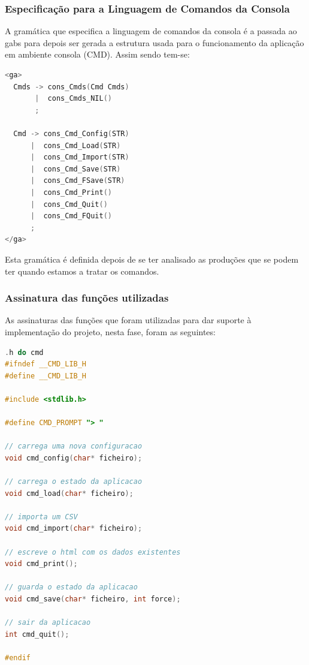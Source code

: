 \documentclass[11pt, a4paper, oneside]{article}
\begin{document}
\subsubsection{Especificação para a Linguagem de Comandos da Consola}
A gramática que especifica a linguagem de comandos da consola é a passada ao \textsf{gabs} para depois ser gerada a estrutura usada para o funcionamento da aplicação em ambiente consola (CMD). Assim sendo tem-se:
\begin{lstlisting}[language=C, caption={Gramática para a linguagem de especificação para a linguagem de comandos de consola.}]
<ga>
  Cmds -> cons_Cmds(Cmd Cmds)
       |  cons_Cmds_NIL()
       ;

  Cmd -> cons_Cmd_Config(STR)
      |  cons_Cmd_Load(STR)
      |  cons_Cmd_Import(STR)
      |  cons_Cmd_Save(STR)
      |  cons_Cmd_FSave(STR)
      |  cons_Cmd_Print()
      |  cons_Cmd_Quit()
      |  cons_Cmd_FQuit()
      ;
</ga>
\end{lstlisting}

Esta gramática é definida depois de se ter analisado as produções que se podem ter quando estamos a tratar os comandos.

\subsubsection{Assinatura das funções utilizadas}
As assinaturas das funções que foram utilizadas para dar suporte à implementação do projeto, nesta fase, foram as seguintes:

\begin{lstlisting}[language=C, caption={Construtores do ficheiro de consola.}]
.h do cmd
#ifndef __CMD_LIB_H
#define __CMD_LIB_H

#include <stdlib.h>

#define CMD_PROMPT "> "

// carrega uma nova configuracao
void cmd_config(char* ficheiro);

// carrega o estado da aplicacao
void cmd_load(char* ficheiro);

// importa um CSV
void cmd_import(char* ficheiro);

// escreve o html com os dados existentes
void cmd_print();

// guarda o estado da aplicacao
void cmd_save(char* ficheiro, int force);

// sair da aplicacao
int cmd_quit();

#endif
\end{lstlisting} 
\end{document}
